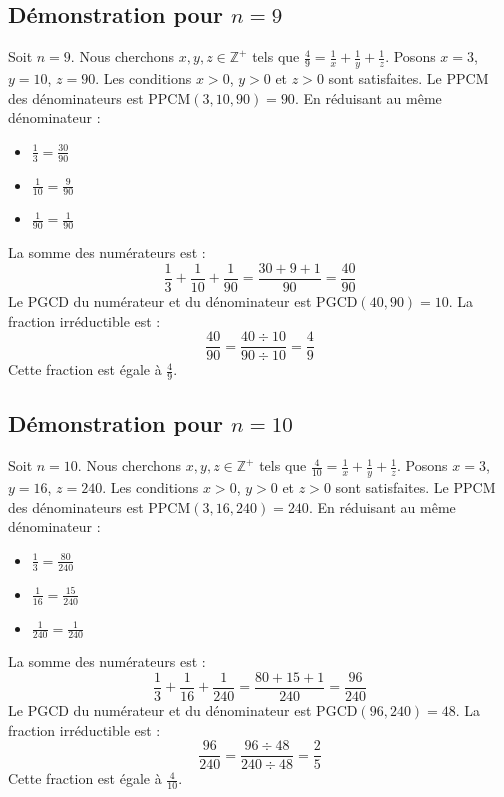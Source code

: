 \documentclass[11pt,a4paper]{article}
\begin{document}
\subsection{Démonstration pour $n = 9$}
Soit $n = 9$. Nous cherchons $x, y, z \in \mathbb{Z}^{+}$ tels que $\frac{4}{9} = \frac{1}{x} + \frac{1}{y} + \frac{1}{z}$.
Posons $x = 3$, $y = 10$, $z = 90$.
Les conditions $x > 0$, $y > 0$ et $z > 0$ sont satisfaites.
Le PPCM des dénominateurs est $\text{PPCM}(3, 10, 90) = 90$.
En réduisant au même dénominateur :
\begin{itemize}
    \item $\frac{1}{3} = \frac{30}{90}$
    \item $\frac{1}{10} = \frac{9}{90}$
    \item $\frac{1}{90} = \frac{1}{90}$
\end{itemize}
La somme des numérateurs est :
$$ \frac{1}{3} + \frac{1}{10} + \frac{1}{90} = \frac{30 + 9 + 1}{90} = \frac{40}{90} $$
Le PGCD du numérateur et du dénominateur est $\text{PGCD}(40, 90) = 10$.
La fraction irréductible est :
$$ \frac{40}{90} = \frac{40 \div 10}{90 \div 10} = \frac{4}{9} $$
Cette fraction est égale à $\frac{4}{9}$.

\subsection{Démonstration pour $n = 10$}
Soit $n = 10$. Nous cherchons $x, y, z \in \mathbb{Z}^{+}$ tels que $\frac{4}{10} = \frac{1}{x} + \frac{1}{y} + \frac{1}{z}$.
Posons $x = 3$, $y = 16$, $z = 240$.
Les conditions $x > 0$, $y > 0$ et $z > 0$ sont satisfaites.
Le PPCM des dénominateurs est $\text{PPCM}(3, 16, 240) = 240$.
En réduisant au même dénominateur :
\begin{itemize}
    \item $\frac{1}{3} = \frac{80}{240}$
    \item $\frac{1}{16} = \frac{15}{240}$
    \item $\frac{1}{240} = \frac{1}{240}$
\end{itemize}
La somme des numérateurs est :
$$ \frac{1}{3} + \frac{1}{16} + \frac{1}{240} = \frac{80 + 15 + 1}{240} = \frac{96}{240} $$
Le PGCD du numérateur et du dénominateur est $\text{PGCD}(96, 240) = 48$.
La fraction irréductible est :
$$ \frac{96}{240} = \frac{96 \div 48}{240 \div 48} = \frac{2}{5} $$
Cette fraction est égale à $\frac{4}{10}$.
\end{document}
